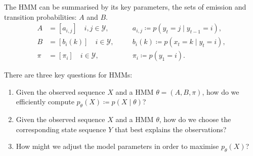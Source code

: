 \documentclass[envcountsect]{beamer}
\newcommand{\boldX}{X}
\newcommand{\boldY}{Y}
\newcommand{\ptheta}{p_\theta}
\begin{document}
\begin{frame}

The HMM can be summarised by its key parameters, the sets of emission and transition probabilities: $A$ and $B$.
\begin{align*}
    A &= [ a_{i,j} ] \quad i,j \in \mathcal{Y}, & \quad & a_{i,j} \coloneqq p(y_t = j \mid y_{t-1} = i), \\
    B  &= [ b_i(k) ] \quad i \in \mathcal{Y}, & \quad  & b_i(k) \coloneqq p(x_t = k \mid y_t = i), \\
    \pi &= [ \pi_i ] \quad i \in \mathcal{Y}, & \quad & \pi_i \coloneqq p(y_1 = i).
\end{align*}

\pause

There are three key questions for HMMs:
\begin{enumerate}
    \item Given the observed sequence $\boldX$ and a HMM $\theta = (A, B, \pi)$, how do we efficiently compute $\ptheta(\boldX) \coloneqq p(\boldX \mid \theta)$?
    \item Given the observed sequence $\boldX$ and a HMM $\theta$, how do we choose the corresponding state sequence $\boldY$ that best explains the observations?
    \item How might we adjust the model parameters in order to maximise $\ptheta(\boldX)$?
\end{enumerate}

\end{frame}
\end{document}
